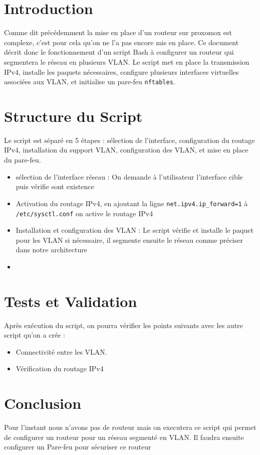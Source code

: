 \documentclass[../file.tex]{subfiles}
\begin{document}
\section{Introduction}
Comme dit précédemment la mise en place d'un routeur sur proxomox est complexe, c'est pour cela qu'on ne l'a pas encore mis en place. Ce document décrit donc le fonctionnement d'un script Bash à configurer un routeur qui segmentera le réseau en plusieurs VLAN. Le script met en place la transmission IPv4, installe les paquets nécessaires, configure plusieurs interfaces virtuelles associées aux VLAN, et initialise un pare-feu \texttt{nftables}.

\section{Structure du Script}
Le script est séparé en 5 étapes : sélection de l’interface, configuration du routage IPv4, installation du support VLAN, configuration des VLAN, et mise en place du pare-feu.
\begin{itemize}
    \item sélection de l’interface réseau : On demande à l'utilisateur l'interface cible puis vérifie sont existence
    \item Activation du routage IPv4, en ajoutant la ligne \texttt{net.ipv4.ip_forward=1} à \texttt{/etc/sysctl.conf} on active le routage IPv4
    \item Installation et configuration des VLAN : Le script vérifie et installe le paquet pour les VLAN si nécessaire, il segmente ensuite le réseau comme préciser dans notre architecture
    \item 
\end{itemize}

\section{Tests et Validation}
Après exécution du script, on pourra vérifier les points suivants avec les autre script qu'on a crée :
\begin{itemize}
    \item Connectivité entre les VLAN.
    \item Vérification du routage IPv4
\end{itemize}

\section{Conclusion}
Pour l'instant nous n'avons pas de routeur mais on executera ce script qui permet de configurer un routeur pour un réseau segmenté en VLAN. Il faudra ensuite configurer un Pare-feu pour sécuriser ce routeur
\end{document}
